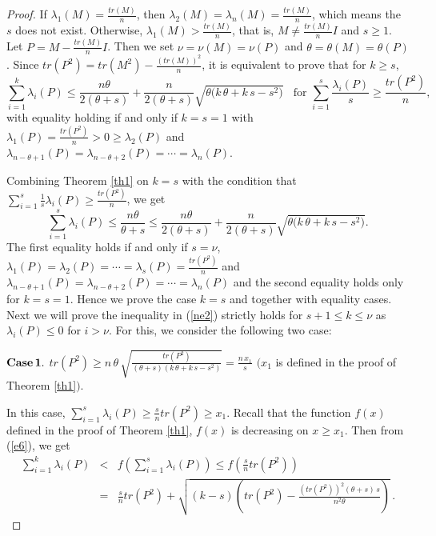 \documentclass[12pt]{article}
\begin{document}
\begin{proof}
If $\lambda_1(M)=\frac{tr(M)}{n}$, then $\lambda_2(M)=\lambda_n(M)=\frac{tr(M)}{n}$, which means the $s$ does not exist.
Otherwise, $\lambda_1(M)>\frac{tr(M)}{n}$, that is, $M\neq\frac{tr(M)}{n}I$ and $s\geq 1$. Let $P=M-\frac{tr(M)}{n}I$. Then we set $\nu=\nu(M)=\nu(P)$ and $\theta=\theta(M)=\theta(P)$.
 Since $tr(P^2)=tr(M^2)-\frac{(tr(M))^2}{n}$, it is equivalent to prove that for $k\geq s$,
 \begin{equation}
 \sum_{i=1}^{k}\lambda_i(P)\leq\frac{n\theta}{2(\theta+s)}+\frac{n}{2(\theta+s)}\sqrt{\theta\big(k\,\theta+k\,s-s^2\big)}~~~~\mbox{for  }\sum\limits_{i=1}^s\frac{\lambda_i(P)}{s}\geq \frac{tr(P^2)}{n},\label{ne2}
 \end{equation}
 with equality holding if and only if $k=s=1$ with $\lambda_1(P)=\frac{tr(P^2)}{n}>0\geq \lambda_2(P)$ and
 $\lambda_{n-\theta+1}(P)=\lambda_{n-\theta+2}(P)=\cdots=\lambda_n(P)$.

\vspace*{3mm}
 
 Combining Theorem \ref{th1} on $k=s$ with the condition that $\sum\limits_{i=1}^s\frac{1}{s}\lambda_i(P)\geq \frac{tr(P^2)}{n}$, we get
 $$\sum\limits_{i=1}^s\lambda_i(P)\leq\frac{n\theta}{\theta+s}\leq \frac{n\theta}{2(\theta+s)}+\frac{n}{2(\theta+s)}\sqrt{\theta\big(k\,\theta+k\,s-s^2\big)}.$$
 The first equality holds if and only if $s=\nu$, $\lambda_1(P)=\lambda_2(P)=\cdots=\lambda_s(P)=\frac{tr(P^2)}{n}$ and
 $\lambda_{n-\theta+1}(P)=\lambda_{n-\theta+2}(P)=\cdots=\lambda_n(P)$ and the second equality holds only for $k=s=1$.
 Hence we prove the case $k=s$ and together with equality cases.
 Next we will prove the inequality in (\ref{ne2}) strictly holds for $s+1\leq k\leq \nu$ as $\lambda_i(P)\leq 0$ for $i>\nu$. For this, we consider the following
two case: \vspace*{3mm}

\noindent
${\bf Case\,1.}$ $tr(P^2)\geq n\,\theta\,\sqrt{\displaystyle{\frac{tr(P^2)}{(\theta+s)(k\,\theta+k\,s-s^2)}}}=\displaystyle{\frac{n\,x_1}{s}}$ $(x_1$ is defined in the proof of Theorem \ref{th1}$)$. 

\vspace*{3mm}

In this case, $\sum\limits_{i=1}^s\lambda_i(P)\geq \frac{s}{n}tr(P^2)\geq x_1$. Recall that the function $f(x)$ defined in the proof of Theorem \ref{th1}, $f(x)$ is decreasing on $x\geq x_1$. Then from (\ref{e6}), we get
 \begin{eqnarray}
  \sum_{i=1}^{k}\lambda_i(P)&< &f\left(\sum\limits_{i=1}^s\lambda_i(P)\right)\leq f\left(\frac{s}{n}tr(P^2)\right)\nonumber\\[2mm]
  &=&\frac{s}{n}tr(P^2)+\sqrt{(k-s)\left(tr(P^2)-\frac{(tr(P^2))^2(\theta+s)\,s}{n^2\theta}\right)}\,.\label{eq1}
 \end{eqnarray}


\end{proof}
\end{document}
